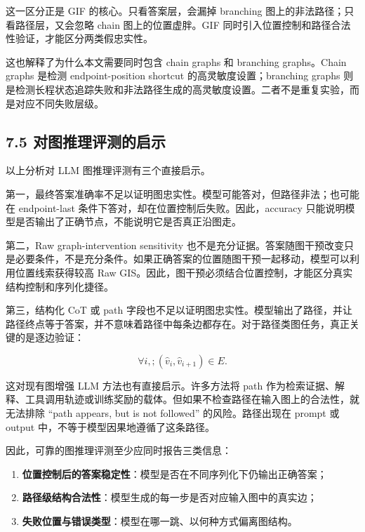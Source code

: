 \documentclass[
  11pt,
]{article}
\begin{document}
这一区分正是 GIF 的核心。只看答案层，会漏掉 branching
图上的非法路径；只看路径层，又会忽略 chain 图上的位置虚胖。GIF
同时引入位置控制和路径合法性验证，才能区分两类假忠实性。

这也解释了为什么本文需要同时包含 chain graphs 和 branching graphs。Chain
graphs 是检测 endpoint-position shortcut 的高灵敏度设置；branching
graphs
则是检测长程状态追踪失败和非法路径生成的高灵敏度设置。二者不是重复实验，而是对应不同失败层级。

\subsection{7.5
对图推理评测的启示}\label{ux5bf9ux56feux63a8ux7406ux8bc4ux6d4bux7684ux542fux793a}

以上分析对 LLM 图推理评测有三个直接启示。

第一，最终答案准确率不足以证明图忠实性。模型可能答对，但路径非法；也可能在
endpoint-last 条件下答对，却在位置控制后失败。因此，accuracy
只能说明模型是否输出了正确节点，不能说明它是否真正沿图走。

第二，Raw graph-intervention sensitivity
也不是充分证据。答案随图干预改变只是必要条件，不是充分条件。如果正确答案的位置随图干预一起移动，模型可以利用位置线索获得较高
Raw
GIS。因此，图干预必须结合位置控制，才能区分真实结构控制和序列化捷径。

第三，结构化 CoT 或 path
字段也不足以证明图忠实性。模型输出了路径，并让路径终点等于答案，并不意味着路径中每条边都存在。对于路径类图任务，真正关键的是逐边验证：

\[
\forall i,;(\hat{v}_i,\hat{v}_{i+1})\in E.  
\]

这对现有图增强 LLM 方法也有直接启示。许多方法将 path
作为检索证据、解释、工具调用轨迹或训练奖励的载体。但如果不检查路径在输入图上的合法性，就无法排除
``path appears, but is not followed'' 的风险。路径出现在 prompt 或
output 中，不等于模型因果地遵循了这条路径。

因此，可靠的图推理评测至少应同时报告三类信息：

\begin{enumerate}
\def\labelenumi{\arabic{enumi}.}
\item
  \textbf{位置控制后的答案稳定性}：模型是否在不同序列化下仍输出正确答案；
\item
  \textbf{路径级结构合法性}：模型生成的每一步是否对应输入图中的真实边；
\item
  \textbf{失败位置与错误类型}：模型在哪一跳、以何种方式偏离图结构。
\end{enumerate}
\end{document}
